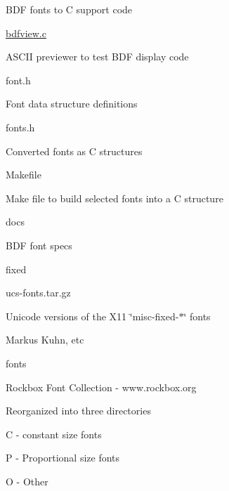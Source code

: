 \begin{DoxyItemize}
\begin{DoxyItemize}
\begin{DoxyItemize}
\begin{DoxyItemize}
\item B\-D\-F fonts to C support code
\end{DoxyItemize}
\item \hyperlink{bdfview_8c}{bdfview.\-c}
\begin{DoxyItemize}
\item A\-S\-C\-I\-I previewer to test B\-D\-F display code
\end{DoxyItemize}
\item font.\-h
\begin{DoxyItemize}
\item Font data structure definitions
\end{DoxyItemize}
\item fonts.\-h
\begin{DoxyItemize}
\item Converted fonts as C structures
\end{DoxyItemize}
\item Makefile
\begin{DoxyItemize}
\item Make file to build selected fonts into a C structure
\end{DoxyItemize}
\item docs
\begin{DoxyItemize}
\item B\-D\-F font specs
\end{DoxyItemize}
\item fixed
\begin{DoxyItemize}
\item ucs-\/fonts.\-tar.\-gz
\item Unicode versions of the X11 \char`\"{}misc-\/fixed-\/$\ast$\char`\"{} fonts
\item Markus Kuhn, etc
\end{DoxyItemize}
\item fonts
\begin{DoxyItemize}
\item Rockbox Font Collection -\/ www.\-rockbox.\-org
\item Reorganized into three directories
\begin{DoxyItemize}
\item C -\/ constant size fonts
\item P -\/ Proportional size fonts
\item O -\/ Other
\end{DoxyItemize}
\end{DoxyItemize}
\end{DoxyItemize}

\end{DoxyItemize}
\end{DoxyItemize}
